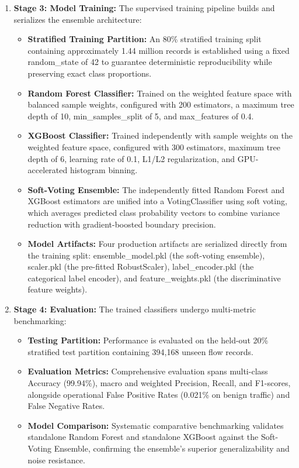 \documentclass[12pt,a4paper]{report}
\begin{document}
\begin{enumerate}[leftmargin=*]
    \item \textbf{Stage 3: Model Training:} The supervised training pipeline builds and serializes the ensemble architecture:
    \begin{itemize}[leftmargin=*,itemsep=2pt,topsep=2pt]
        \item \textbf{Stratified Training Partition:} An 80\% stratified training split containing approximately 1.44 million records is established using a fixed random\_state of 42 to guarantee deterministic reproducibility while preserving exact class proportions.
        \item \textbf{Random Forest Classifier:} Trained on the weighted feature space with balanced sample weights, configured with 200 estimators, a maximum tree depth of 10, min\_samples\_split of 5, and max\_features of 0.4.
        \item \textbf{XGBoost Classifier:} Trained independently with sample weights on the weighted feature space, configured with 300 estimators, maximum tree depth of 6, learning rate of 0.1, L1/L2 regularization, and GPU-accelerated histogram binning.
        \item \textbf{Soft-Voting Ensemble:} The independently fitted Random Forest and XGBoost estimators are unified into a VotingClassifier using soft voting, which averages predicted class probability vectors to combine variance reduction with gradient-boosted boundary precision.
        \item \textbf{Model Artifacts:} Four production artifacts are serialized directly from the training split: ensemble\_model.pkl (the soft-voting ensemble), scaler.pkl (the pre-fitted RobustScaler), label\_encoder.pkl (the categorical label encoder), and feature\_weights.pkl (the discriminative feature weights).
    \end{itemize}

    \item \textbf{Stage 4: Evaluation:} The trained classifiers undergo multi-metric benchmarking:
    \begin{itemize}[leftmargin=*,itemsep=2pt,topsep=2pt]
        \item \textbf{Testing Partition:} Performance is evaluated on the held-out 20\% stratified test partition containing 394,168 unseen flow records.
        \item \textbf{Evaluation Metrics:} Comprehensive evaluation spans multi-class Accuracy (99.94\%), macro and weighted Precision, Recall, and F1-scores, alongside operational False Positive Rates (0.021\% on benign traffic) and False Negative Rates.
        \item \textbf{Model Comparison:} Systematic comparative benchmarking validates standalone Random Forest and standalone XGBoost against the Soft-Voting Ensemble, confirming the ensemble's superior generalizability and noise resistance.
    \end{itemize}


\end{enumerate}
\end{document}
